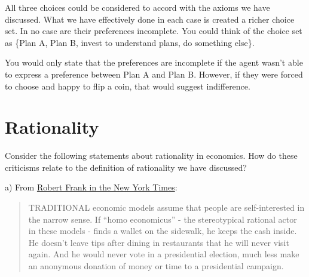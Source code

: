 \documentclass[
  letterpaper,
  DIV=11,
  numbers=noendperiod]{scrreprt}
\begin{document}
\begin{tcolorbox}[enhanced jigsaw, title=\textcolor{quarto-callout-tip-color}{\faLightbulb}\hspace{0.5em}{Answer}, toprule=.15mm, colback=white, breakable, titlerule=0mm, colframe=quarto-callout-tip-color-frame, coltitle=black, opacityback=0, rightrule=.15mm, colbacktitle=quarto-callout-tip-color!10!white, bottomtitle=1mm, opacitybacktitle=0.6, arc=.35mm, bottomrule=.15mm, toptitle=1mm, leftrule=.75mm, left=2mm]

All three choices could be considered to accord with the axioms we have
discussed. What we have effectively done in each case is created a
richer choice set. In no case are their preferences incomplete. You
could think of the choice set as \{Plan A, Plan B, invest to understand
plans, do something else\}.

You would only state that the preferences are incomplete if the agent
wasn't able to express a preference between Plan A and Plan B. However,
if they were forced to choose and happy to flip a coin, that would
suggest indifference.

\end{tcolorbox}

\hypertarget{rationality-1}{%
\section{Rationality}\label{rationality-1}}

Consider the following statements about rationality in economics. How do
these criticisms relate to the definition of rationality we have
discussed?

a) From
\href{https://www.nytimes.com/2008/02/10/business/10view.html}{Robert
Frank in the New York Times}:

\begin{quote}
TRADITIONAL economic models assume that people are self-interested in
the narrow sense. If ``homo economicus'' - the stereotypical rational
actor in these models - finds a wallet on the sidewalk, he keeps the
cash inside. He doesn't leave tips after dining in restaurants that he
will never visit again. And he would never vote in a presidential
election, much less make an anonymous donation of money or time to a
presidential campaign.
\end{quote}
\end{document}
